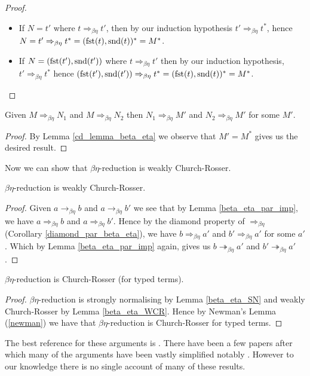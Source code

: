 \begin{proof}
\begin{itemize}
\begin{itemize}
            \item If $N = t'$ where $t \Rightarrow_{\beta\eta} t'$, then by our induction hypothesis $t' \Rightarrow_{\beta\eta} t^*$, hence $N = t' \Rightarrow_{\beta\eta} t^* = (\mathrm{fst}(t), \mathrm{snd}(t))^* = M^*$.
            \item If $N = (\mathrm{fst}(t'), \mathrm{snd}(t'))$ where $t \Rightarrow_{\beta\eta} t'$ then by our induction hypothesis, $t' \Rightarrow_{\beta\eta} t^*$ hence $(\mathrm{fst}(t'), \mathrm{snd}(t')) \Rightarrow_{\beta\eta} t^* = (\mathrm{fst} (t), \mathrm{snd}(t))^* = M^*$.
        \end{itemize}
    \end{itemize}
\end{proof}

\begin{cor}\label{diamond_par_beta_eta}
    Given $M \Rightarrow_{\beta\eta} N_1$ and $M \Rightarrow_{\beta\eta} N_2$ then $N_1 \Rightarrow_{\beta\eta} M'$ and $N_2 \Rightarrow_{\beta\eta} M'$ for some $M'$.
\end{cor}

\begin{proof}
    By Lemma \ref{cd_lemma_beta_eta} we observe that $M' = M^*$ gives us the desired result.
\end{proof}

Now we can show that $\beta\eta$-reduction is weakly Church-Rosser.

\begin{lemma}\label{beta_eta_WCR}
    $\beta\eta$-reduction is weakly Church-Rosser.
\end{lemma}

\begin{proof}
    Given $a \to_{\beta\eta} b$ and $a \to_{\beta\eta} b'$ we see that by Lemma \ref{beta_eta_par_imp}, we have $a \Rightarrow_{\beta\eta} b$ and $a \Rightarrow_{\beta\eta} b'$. Hence by the diamond property of $\Rightarrow_{\beta\eta}$ (Corollary \ref{diamond_par_beta_eta}), we have $b \Rightarrow_{\beta\eta} a'$ and $b' \Rightarrow_{\beta\eta} a'$ for some $a'$. Which by Lemma \ref{beta_eta_par_imp} again, gives us $b \twoheadrightarrow_{\beta\eta} a'$ and $b' \twoheadrightarrow_{\beta\eta} a'$.
\end{proof}

\begin{theorem}\label{beta_eta_CR}
    $\beta\eta$-reduction is Church-Rosser (for typed terms).
\end{theorem}

\begin{proof}
    $\beta\eta$-reduction is strongly normalising by Lemma \ref{beta_eta_SN} and weakly Church-Rosser by Lemma \ref{beta_eta_WCR}. Hence by Newman's Lemma (\ref{newman}) we have that $\beta\eta$-reduction is Church-Rosser for typed terms. 
\end{proof}

The best reference for these arguments is \cite{barendregt1984lambda}. There have been a few papers after which many of the arguments have been vastly simplified notably \cite{TakahashiM1989PRIL}. However to our knowledge there is no single account of many of these results.

